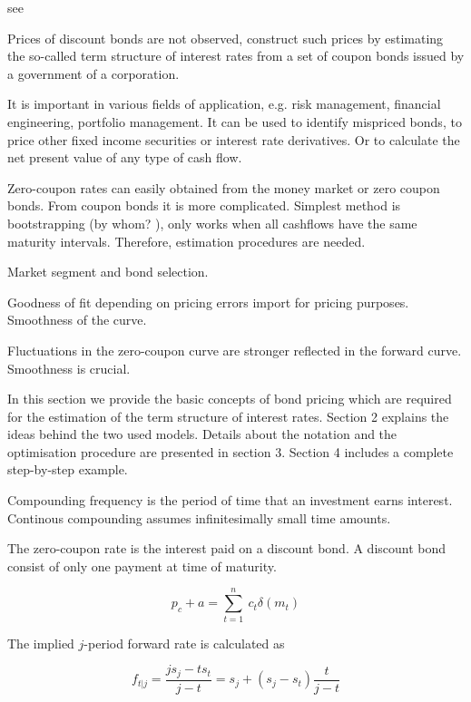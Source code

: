 see \cite{Lin2002, Zangari1997}

Prices of discount bonds are not observed, construct such prices by estimating the so-called term structure of interest rates from a set of coupon bonds issued by a government of a corporation.

It is important in various fields of application, e.g. risk management, financial engineering, portfolio management. It can be used to identify mispriced bonds, to price other fixed income securities or interest rate derivatives. Or to calculate the net present value of any type of cash flow. 

Zero-coupon rates can easily obtained from the money market or zero coupon bonds. From coupon bonds it is more complicated. Simplest method is bootstrapping (by whom? \cite{Hagan2006}), only works when all cashflows have the same maturity intervals. Therefore, estimation procedures are needed.

Market segment and bond selection.

Goodness of fit depending on pricing errors import for pricing purposes. Smoothness of the curve.

Fluctuations in the zero-coupon curve are stronger reflected in the forward curve. Smoothness is crucial.

In this section we provide the basic concepts of bond pricing which are required for the estimation of the term structure of interest rates. Section 2 explains the ideas behind the two used models. Details about the notation and the optimisation procedure are presented in section 3. Section 4 includes a complete step-by-step example.


Compounding frequency is the period of time that an investment earns interest. Continous compounding assumes infinitesimally small time amounts.

The zero-coupon rate is the interest paid on a discount bond. A discount bond consist of only one payment at time of maturity.


\begin{equation}
  \label{bondprceq2}
  p_c+a=\sum_{t=1}^n \ c_t \delta(m_t) \end{equation}


The implied $j$-period forward rate is calculated as

\begin{equation}
  \label{forwrate}
  f_{t|j}=\frac{js_j-ts_t}{j-t}=s_j+(s_j-s_t)\frac{t}{j-t}
\end{equation}

